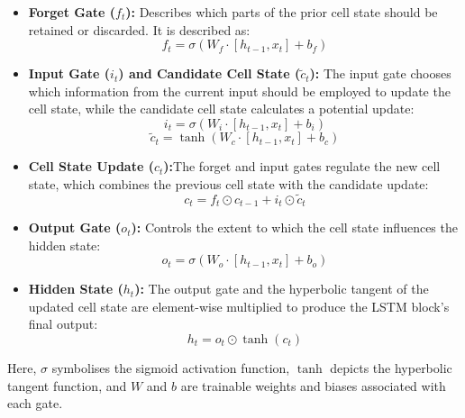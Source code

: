 \documentclass[conference]{IEEEtran}
\begin{document}
\begin{itemize}
    \item \textbf{Forget Gate ($f_t$):} Describes which parts of the prior cell state should be retained or discarded. It is described as:
    \begin{equation}
        f_t = \sigma(W_f \cdot [h_{t-1}, x_t] + b_f)
    \end{equation}
    
    \item \textbf{Input Gate ($i_t$) and Candidate Cell State ($\tilde{c}_t$):} The input gate chooses which information from the current input should be employed to update the cell state, while the candidate cell state calculates a potential update:
    \begin{equation}
        i_t = \sigma(W_i \cdot [h_{t-1}, x_t] + b_i)
    \end{equation}
    \begin{equation}
        \tilde{c}_t = \tanh(W_c \cdot [h_{t-1}, x_t] + b_c)
    \end{equation}
    
    \item \textbf{Cell State Update ($c_t$):}The forget and input gates regulate the new cell state, which combines the previous cell state with the candidate update:
    \begin{equation}
        c_t = f_t \odot c_{t-1} + i_t \odot \tilde{c}_t
    \end{equation}
    
    \item \textbf{Output Gate ($o_t$):} Controls the extent to which the cell state influences the hidden state:
    \begin{equation}
        o_t = \sigma(W_o \cdot [h_{t-1}, x_t] + b_o)
    \end{equation}
    
    \item \textbf{Hidden State ($h_t$):} The output gate and the hyperbolic tangent of the updated cell state are element-wise multiplied to produce the LSTM block's final output:
    \begin{equation}
        h_t = o_t \odot \tanh(c_t)
    \end{equation}
\end{itemize}

Here, $\sigma$ symbolises the sigmoid activation function, $\tanh$ depicts the hyperbolic tangent function, and $W$ and $b$ are trainable weights and biases associated with each gate.
\end{document}
